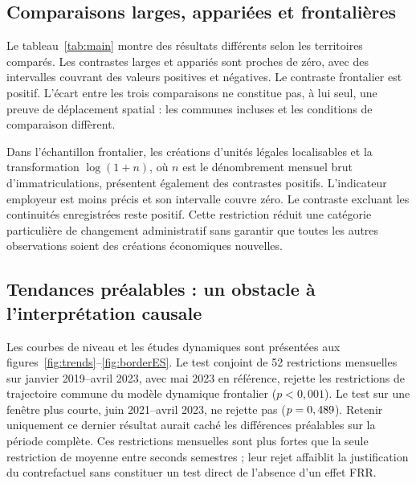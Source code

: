 \subsection{Comparaisons larges, appariées et frontalières}
Le tableau~\ref{tab:main} montre des résultats différents selon les territoires comparés. Les contrastes larges et appariés sont proches de zéro, avec des intervalles couvrant des valeurs positives et négatives. Le contraste frontalier est positif. L’écart entre les trois comparaisons ne constitue pas, à lui seul, une preuve de déplacement spatial : les communes incluses et les conditions de comparaison diffèrent.
\begin{table}[htbp]\centering\small\caption{Contrastes juillet–décembre 2024 par rapport aux mêmes mois de 2019–2022}\label{tab:main}\end{table}

Dans l’échantillon frontalier, les créations d’unités légales localisables et la transformation $\log(1+n)$, où $n$ est le dénombrement mensuel brut d’immatriculations, présentent également des contrastes positifs. L’indicateur employeur est moins précis et son intervalle couvre zéro. Le contraste excluant les continuités enregistrées reste positif. Cette restriction réduit une catégorie particulière de changement administratif sans garantir que toutes les autres observations soient des créations économiques nouvelles.
\begin{table}[htbp]\centering\small\caption{Comparaisons frontalières selon l’indicateur observé}\label{tab:border}\end{table}

\subsection{Tendances préalables : un obstacle à l’interprétation causale}
Les courbes de niveau et les études dynamiques sont présentées aux figures~\ref{fig:trends}–\ref{fig:borderES}. Le test conjoint de 52 restrictions mensuelles sur janvier 2019–avril 2023, avec mai 2023 en référence, rejette les restrictions de trajectoire commune du modèle dynamique frontalier ($p<0{,}001$). Le test sur une fenêtre plus courte, juin 2021–avril 2023, ne rejette pas ($p=0,489$). Retenir uniquement ce dernier résultat aurait caché les différences préalables sur la période complète. Ces restrictions mensuelles sont plus fortes que la seule restriction de moyenne entre seconds semestres ; leur rejet affaiblit la justification du contrefactuel sans constituer un test direct de l’absence d’un effet FRR.

